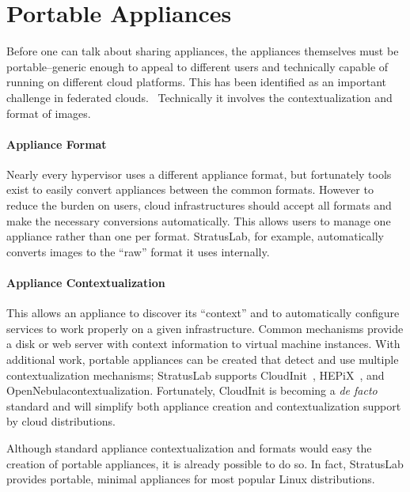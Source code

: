 \section{Portable Appliances}
\label{sec:portable-appliances}

Before one can talk about sharing appliances, the appliances
themselves must be portable--generic enough to appeal to different
users and technically capable of running on different cloud platforms.
This has been identified as an important challenge in federated
clouds.~\cite{Petcu} Technically it involves the contextualization and
format of images.

\paragraph*{Appliance Format}
Nearly every hypervisor uses a different appliance format, but
fortunately tools exist to easily convert appliances between the
common formats.  However to reduce the burden on users, cloud
infrastructures should accept all formats and make the necessary
conversions automatically.  This allows users to manage one appliance
rather than one per format.  StratusLab, for example, automatically
converts images to the ``raw'' format it uses internally. 

\paragraph*{Appliance Contextualization} This allows an appliance to
discover its ``context'' and to automatically configure services to
work properly on a given infrastructure.  Common mechanisms provide a
disk or web server with context information to virtual machine
instances.  With additional work, portable appliances can be created
that detect and use multiple contextualization mechanisms; StratusLab
supports CloudInit~\cite{cloudinit}, HEPiX~\cite{hepixbookcontext},
and OpenNebula\@ contextualization.  Fortunately, CloudInit is
becoming a {\em de facto} standard and will simplify both appliance
creation and contextualization support by cloud distributions.

Although standard appliance contextualization and formats would easy
the creation of portable appliances, it is already possible to do so.
In fact, StratusLab provides portable, minimal appliances for most
popular Linux distributions.
